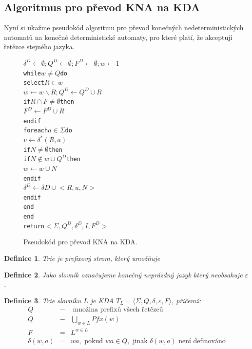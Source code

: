 \documentclass[10pt, a4paper, titlepage]{article}
\theoremstyle{note}
\newtheorem{definice}{Definice}
\begin{document}
\subsection{Algoritmus pro převod KNA na KDA}
Nyní si ukažme pseudokód algoritmu pro převod konečných nedeterministických automatů na konečné deterministické automaty, pro které platí, že
akceptují řetězce stejného jazyka.

\vspace{30px}
\begin{figure}[h]
\begin{alltt}
\( \delta^{D} \leftarrow \emptyset; Q^{D} \leftarrow \emptyset; F^{D} \leftarrow \emptyset; w \leftarrow {1} \)
while \( w \neq Q \) do
     select \( R \in w \)
     \( w \leftarrow w \smallsetminus {R}; Q^{D} \leftarrow Q^{D} \cup {R} \)
     if \( R \cap F \neq \emptyset \) then
         \( F^{D} \leftarrow F^{D} \cup {R} \)
     endif
     foreach \( a \in \Sigma \) do
         \( v \leftarrow \delta^{*}(R, a) \)
         if \( N \neq \emptyset \) then
             if \( N \notin w \cup Q^{D} \) then
                 \( w \leftarrow w \cup {N} \)
             endif
             \( \delta^{D} \leftarrow \delta{D} \cup {<R, u, N>} \)
         endif
     end
end
return \( <\Sigma, Q^{D}, \delta^{D}, I, F^{D}> \)
\end{alltt}
\caption{Pseudokód pro převod KNA na KDA.}
\end{figure}


\begin{definice}
\emph{Trie} je prefixový strom, který umožňuje 
\end{definice}

\begin{definice}
Jako \emph{slovník} označujeme konečný neprázdný jazyk který neobsahuje $\varepsilon$.
\end{definice}

\begin{definice}
Trie slovníku $L$ je KDA $T_{L} = \langle \Sigma, Q, \delta, \varepsilon, F \rangle$, přičemž:
\begin{eqnarray*}
Q &-& \text{ množina prefixů všech řetězců} \\
Q &-& \bigcup_{w \in L} Pfx(w) \\
F &=& L^{w \in L} \\
\delta(w,a) &=& wa, \text{ pokud } wa \in Q, \text{ jinak } \delta(w,a) \text{ není definováno}
\end{eqnarray*}
\end{definice}
\end{document}
